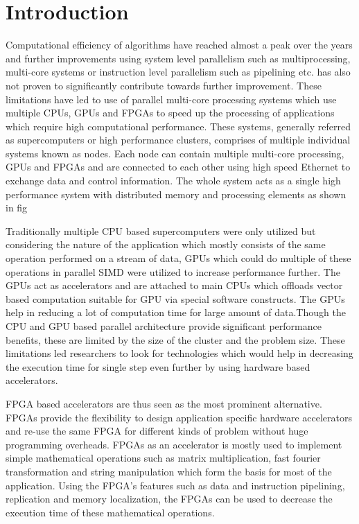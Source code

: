 \chapter{Introduction}
\label{cha:Introduction}

Computational efficiency of algorithms have reached almost a peak over the years
and further improvements using system level parallelism such as multiprocessing, multi-core systems
or instruction level parallelism such as pipelining etc. has also not proven to significantly contribute
towards further improvement. These limitations have led to use of parallel multi-core processing
systems which use multiple CPUs, GPUs and FPGAs to speed up the processing of applications
which require high computational performance. These systems, generally referred as supercomputers or
high performance clusters, comprises of multiple individual systems known as nodes. Each node
can contain multiple multi-core processing, GPUs and FPGAs and are connected to each other
using high speed Ethernet to exchange data and control information. The whole system acts
as a single high performance system with distributed memory and processing elements as shown in fig


Traditionally multiple CPU based supercomputers were only utilized but considering the nature
of the application which mostly consists of the same operation performed on a stream of data,
GPUs which could do multiple of these operations in parallel \ac{SIMD} were utilized
to increase performance further. The GPUs act as accelerators and are attached to main CPUs
which offloads vector based computation suitable for GPU via special software constructs.
The GPUs help in reducing a lot of computation time for large amount of data.Though the CPU
and GPU based parallel architecture provide significant performance benefits,
these are limited by the size of the cluster and the problem size. These limitations led
researchers to look for technologies which would help in decreasing the execution time for
single step even further by using hardware based accelerators.

FPGA based accelerators are thus seen as the most prominent alternative. FPGAs provide the flexibility
to design application specific hardware accelerators and re-use the same FPGA for different kinds
of problem without huge programming overheads. FPGAs as an accelerator is mostly used to implement
simple mathematical operations such as matrix multiplication, fast fourier transformation and
string manipulation which form the basis for most of the application. Using the FPGA's features
such as data and instruction pipelining, replication and memory localization, the FPGAs can be
used to decrease the execution time of these mathematical operations.

